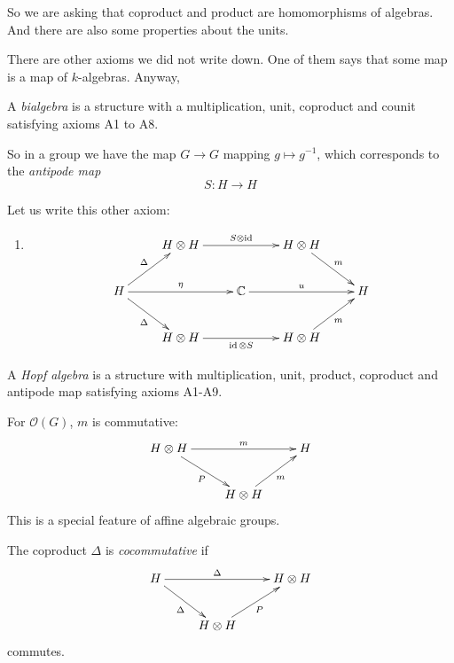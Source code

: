 \begin{remark}
\label{remark-l1-homomorphisms}
So we are asking that coproduct and
product are homomorphisms of algebras.
And there are also some properties about
the units.
\end{remark}

\begin{remark}
\label{remark-l1-other-axioms}
There are other axioms we did not write
down. One of them says that some map is a
map of $k$-algebras. Anyway,
\end{remark}

\begin{definition}
\label{definition-l1-bialgebra}
A {\it bialgebra} is a structure with a
multiplication, unit, coproduct and
counit satisfying axioms A1 to A8.
\end{definition}

So in a group we have the map
$G\to G$ mapping $g\mapsto g^{-1}$, which
corresponds to the {\it antipode map}
$$
S:H\to H
$$

Let us write this other axiom:
\begin{enumerate}
\item[{\bf A9}]
$$
\xymatrix{
& H\otimes H
\ar[rr]^-{S\otimes\operatorname{id}}
&& H\otimes H \ar[dr]^{m}\\
H \ar[ur]^{\Delta} \ar[dr]_{\Delta}
\ar[rr]^-{\eta}
&& \mathbb{C} \ar[rr]^-{u} && H\\
& H\otimes H
\ar[rr]_-{\operatorname{id}\otimes S}
&& H\otimes H \ar[ur]_{m}
}
$$
\end{enumerate}

\begin{definition}
\label{definition-l1-hopf-algebra}
A {\it Hopf algebra} is a structure with
multiplication, unit, product, coproduct
and antipode map satisfying axioms
A1-A9.
\end{definition}

\begin{remark}
\label{remark-l1-commutative}
For $\mathcal{O}(G)$, $m$ is commutative:
$$
\xymatrix{
H\otimes H \ar[rr]^-{m}
\ar[dr]_{P} && H\\
& H\otimes H \ar[ur]_{m}
}
$$
This is a special feature of affine
algebraic groups.
\end{remark}

\begin{definition}
\label{definition-l1-cocommutative}
The coproduct $\Delta$ is
{\it cocommutative} if
$$
\xymatrix{
H \ar[rr]^-{\Delta}
\ar[dr]_{\Delta} && H\otimes H\\
& H\otimes H \ar[ur]_{P}
}
$$
commutes.
\end{definition}


